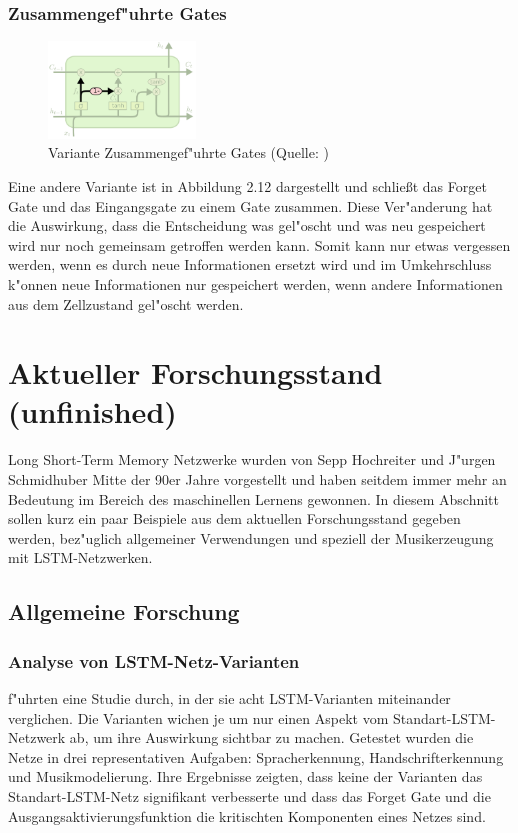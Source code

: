 {\subsubsection{Zusammengef"uhrte Gates}
\begin{figure}
  \vspace{-40pt}
  \begin{center}
    \includegraphics[width=0.35\textwidth]{pictures/LSTM3-var-tied_cut.png}
  \end{center}
  \vspace{-20pt}
  \caption[LSTM Variante: Zusammengef"uhrte Gates]{Variante Zusammengef"uhrte Gates (Quelle: \cite{OlahImg})}
\vspace{-10pt}
\end{figure}
Eine andere Variante ist in Abbildung 2.12 dargestellt und schlie{\ss}t das Forget Gate und das Eingangsgate zu einem Gate zusammen. Diese Ver"anderung hat die Auswirkung, dass die Entscheidung was gel"oscht und was neu gespeichert wird nur noch gemeinsam getroffen werden kann. Somit kann nur etwas vergessen werden, wenn es durch neue Informationen ersetzt wird und im Umkehrschluss k"onnen neue Informationen nur gespeichert werden, wenn andere Informationen aus dem Zellzustand gel"oscht werden.


\section{Aktueller Forschungsstand (unfinished)}
Long Short-Term Memory Netzwerke wurden von Sepp Hochreiter und J"urgen Schmidhuber Mitte der 90er Jahre vorgestellt und haben seitdem immer mehr an Bedeutung im Bereich des maschinellen Lernens gewonnen. In diesem Abschnitt sollen kurz ein paar Beispiele aus dem aktuellen Forschungsstand gegeben werden, bez"uglich allgemeiner Verwendungen und speziell der Musikerzeugung mit LSTM-Netzwerken.

\subsection{Allgemeine Forschung}

\subsubsection{Analyse von LSTM-Netz-Varianten}
\cite{SpaceOdyssey} f"uhrten eine Studie durch, in der sie acht LSTM-Varianten miteinander verglichen. Die Varianten wichen je um nur einen Aspekt vom Standart-LSTM-Netzwerk ab, um ihre Auswirkung sichtbar zu machen. Getestet wurden die Netze in drei representativen Aufgaben: Spracherkennung, Handschrifterkennung und Musikmodelierung. Ihre Ergebnisse zeigten, dass keine der Varianten das Standart-LSTM-Netz signifikant verbesserte und dass das Forget Gate und die Ausgangsaktivierungsfunktion die kritischten Komponenten eines Netzes sind.

}
